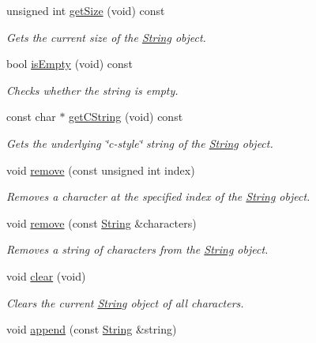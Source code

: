 \begin{DoxyCompactItemize}
unsigned int \hyperlink{classsparky_1_1_string_a20669b1ee45ab5284f6f1b6084f0b3ca}{get\+Size} (void) const 
\begin{DoxyCompactList}\small\item\em Gets the current size of the \hyperlink{classsparky_1_1_string}{String} object. \end{DoxyCompactList}\item 
bool \hyperlink{classsparky_1_1_string_ab1d4871ef4037f83737e8cb1b20a1cc5}{is\+Empty} (void) const 
\begin{DoxyCompactList}\small\item\em Checks whether the string is empty. \end{DoxyCompactList}\item 
const char $\ast$ \hyperlink{classsparky_1_1_string_ad83d3027b653c48a1c98fd04e7159b92}{get\+C\+String} (void) const 
\begin{DoxyCompactList}\small\item\em Gets the underlying \char`\"{}c-\/style\char`\"{} string of the \hyperlink{classsparky_1_1_string}{String} object. \end{DoxyCompactList}\item 
void \hyperlink{classsparky_1_1_string_a1955425c361ec2977202de942672097e}{remove} (const unsigned int index)
\begin{DoxyCompactList}\small\item\em Removes a character at the specified index of the \hyperlink{classsparky_1_1_string}{String} object. \end{DoxyCompactList}\item 
void \hyperlink{classsparky_1_1_string_ae9e44677f9c08dcf4d1db10683e102d0}{remove} (const \hyperlink{classsparky_1_1_string}{String} \&characters)
\begin{DoxyCompactList}\small\item\em Removes a string of characters from the \hyperlink{classsparky_1_1_string}{String} object. \end{DoxyCompactList}\item 
void \hyperlink{classsparky_1_1_string_a857b94c410805c02f53a09d01d159da8}{clear} (void)
\begin{DoxyCompactList}\small\item\em Clears the current \hyperlink{classsparky_1_1_string}{String} object of all characters. \end{DoxyCompactList}\item 
void \hyperlink{classsparky_1_1_string_a0f96b25f1450b17bfbb19ca7077083b3}{append} (const \hyperlink{classsparky_1_1_string}{String} \&string)

\end{DoxyCompactItemize}
